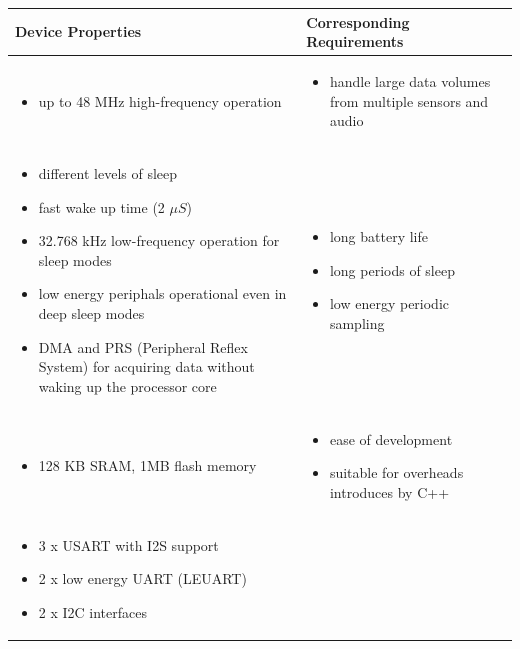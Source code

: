 \begin{table}
\begin{tabular}{|m{}|m{}|}
\hline 
	\textbf{Device Properties} & 
	\textbf{Corresponding Requirements} \\ 
\hline
	\begin{itemize}
	\item up to 48 MHz high-frequency operation
	\end{itemize}&
	\begin{itemize}
	\item handle large data volumes from multiple sensors and audio
	\end{itemize} \\
	
\hline
	\begin{itemize}
	\item different levels of sleep
	\item fast wake up time (2 $\mu S$)
	\item 32.768 kHz low-frequency operation for sleep modes
	\item low energy periphals operational even in deep sleep modes
	\item DMA and PRS (Peripheral Reflex System) for acquiring data without waking up the processor core
	\end{itemize} &
	\begin{itemize}
	\item long battery life
	\item long periods of sleep
	\item low energy periodic sampling
	\end{itemize} \\
\hline
	\begin{itemize}
	\item 128 KB SRAM, 1MB flash memory
	\end{itemize} &
	\begin{itemize}
	\item ease of development
	\item suitable for overheads introduces by C++
	\end{itemize} \\
\hline
	\begin{itemize}
	\item 3 x USART with I2S support
	\item 2 x low energy UART (LEUART)
	\item 2 x I2C interfaces
	\end{itemize} &

\end{tabular}
\end{table}
